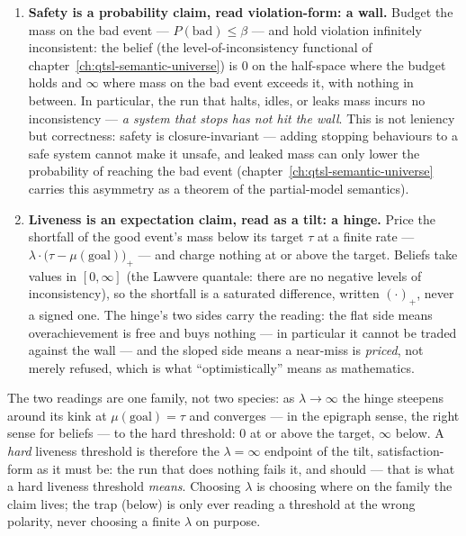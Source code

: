 \begin{enumerate}
\item \textbf{Safety is a probability claim, read violation-form: a
  wall.} Budget the mass on the bad event ---
  $P(\mathrm{bad}) \le \beta$ --- and hold violation infinitely
  inconsistent: the belief (the level-of-inconsistency functional of
  chapter~\ref{ch:qtsl-semantic-universe}) is $0$ on the half-space
  where the budget holds and $\infty$ where mass on the bad event
  exceeds it, with nothing in between. In particular, the run that
  halts, idles, or leaks mass incurs no inconsistency --- \emph{a
  system that stops has not hit the wall}.
  This is not leniency but correctness: safety is
  closure-invariant --- adding stopping behaviours to a safe system
  cannot make it unsafe, and leaked mass can only lower the
  probability of reaching the bad event
  (chapter~\ref{ch:qtsl-semantic-universe} carries this asymmetry as
  a theorem of the partial-model semantics).
\item \textbf{Liveness is an expectation claim, read as a tilt: a
  hinge.} Price the shortfall of the good event's mass below its
  target $\tau$ at a finite rate ---
  $\lambda \cdot \bigl(\tau - \mu(\mathrm{goal})\bigr)_+$ --- and
  charge nothing at or above the target. Beliefs take values in
  $[0, \infty]$ (the Lawvere quantale: there are no negative levels
  of inconsistency), so the shortfall is a saturated difference, written
  $(\cdot)_+$, never a signed one. The hinge's two sides carry the
  reading: the flat side means overachievement is free and buys
  nothing --- in particular it cannot be traded against the wall ---
  and the sloped side means a near-miss is \emph{priced}, not merely
  refused, which is what ``optimistically'' means as mathematics.
\end{enumerate}

The two readings are one family, not two species: as
$\lambda \to \infty$ the hinge steepens around its kink at
$\mu(\mathrm{goal}) = \tau$ and converges --- in the epigraph sense,
the right sense for beliefs --- to the hard threshold: $0$ at or
above the target, $\infty$ below. A \emph{hard} liveness threshold is
therefore the $\lambda = \infty$ endpoint of the tilt,
satisfaction-form as it must be: the run that does nothing fails it,
and should --- that is what a hard liveness threshold \emph{means}. Choosing
$\lambda$ is choosing where on the family the claim lives; the trap
(below) is only ever reading a threshold at the wrong polarity, never
choosing a finite $\lambda$ on purpose.

